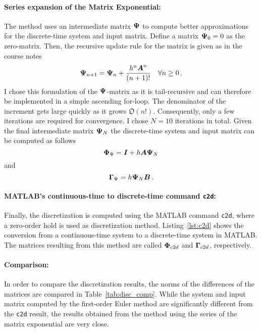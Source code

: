 \paragraph{Series expansion of the Matrix Exponential: } The method uses an intermediate matrix $\boldsymbol{\Psi}$ to compute better approximations for the discrete-time system and input matrix.
Define a matrix $\boldsymbol{\Psi}_0 = 0$ as the zero-matrix.
Then, the recursive update rule for the matrix is given as in the course notes
\begin{equation}
	\boldsymbol{\Psi}_{n+1} = \boldsymbol{\Psi}_n + \frac{h^n \boldsymbol{A}^n}{(n+1)!} \quad \forall n\ge0\, .
\end{equation}
I chose this formulation of the $\boldsymbol{\Psi}$-matrix as it is tail-recursive and can therefore be implemented in a simple ascending for-loop.
The denominator of the increment gets large quickly as it grows $\mathfrak{O}(n!)$.
Consequently, only a few iterations are required for convergence. 
I chose $N=10$ iterations in total.
Given the final intermediate matrix $\boldsymbol{\Psi}_N$ the discrete-time system and input matrix can be computed as follows
\begin{equation}
	\boldsymbol{\Phi}_{\Psi} = \boldsymbol{I} + h\boldsymbol{A}\boldsymbol{\Psi}_N	
\end{equation}
and
\begin{equation}
	\boldsymbol{\Gamma}_{\Psi} = h\boldsymbol{\Psi}_N \boldsymbol{B}\, .
\end{equation}

\paragraph{MATLAB's continuous-time to discrete-time command \texttt{c2d}: } Finally, the discretization is computed using the MATLAB command \texttt{c2d}, where a zero-order hold is used as discretization method.
Listing~\ref{lst:c2d} shows the conversion from a continuous-time system to a discrete-time system in MATLAB.
The matrices resulting from this method are called $\boldsymbol{\Phi}_{c2d}$ and $\boldsymbol{\Gamma}_{c2d}$, respectively.

\paragraph{Comparison: } In order to compare the discretization results, the norms of the differences of the matrices are compared in Table~\ref{tab:disc_comp}.
While the system and input matrix computed by the first-order Euler method are significantly different from the \texttt{c2d} result, the results obtained from the method using the series of the matrix exponential are very close.


